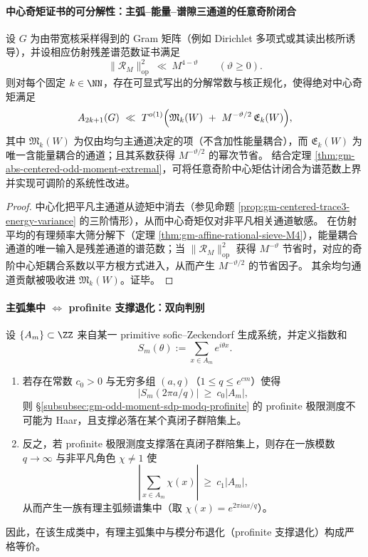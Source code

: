 \paragraph{中心奇矩证书的可分解性：主弧--能量--谱隙三通道的任意奇阶闭合}
\begin{proposition}\label{prop:gm-abs-centered-moment-three-channels}
设 \(G\) 为由带宽核采样得到的 Gram 矩阵（例如 Dirichlet 多项式或其读出核所诱导），并设相应仿射残差谱范数证书满足
\[
\|\mathcal{R}_M\|_{\mathrm{op}}^2\ \ll\ M^{4-\vartheta}\qquad(\vartheta\ge 0).
\]
则对每个固定 \(k\in\NN\)，存在可显式写出的分解常数与核正规化，使得绝对中心奇矩满足
\[
A_{2k+1}(G)\ \ll\ T^{o(1)}
\Bigl(
\mathfrak{M}_k(W)\ +\ M^{-\vartheta/2}\,\mathfrak{E}_k(W)
\Bigr),
\]
其中 \(\mathfrak{M}_k(W)\) 为仅由均匀主通道决定的项（不含加性能量耦合），而 \(\mathfrak{E}_k(W)\) 为唯一含能量耦合的通道；且其系数获得 \(M^{-\vartheta/2}\) 的幂次节省。
结合定理 \ref{thm:gm-abs-centered-odd-moment-extremal}，可将任意奇阶中心矩估计闭合为谱范数上界并实现可调阶的系统性改进。
\end{proposition}

\begin{proof}
中心化把平凡主通道从迹矩中消去（参见命题 \ref{prop:gm-centered-trace3-energy-variance} 的三阶情形），从而中心奇矩仅对非平凡相关通道敏感。
在仿射平均的有理频率大筛分解下（定理 \ref{thm:gm-affine-rational-sieve-M4}），能量耦合通道的唯一输入是残差通道的谱范数；当 \(\|\mathcal{R}_M\|_{\mathrm{op}}^2\) 获得 \(M^{-\vartheta}\) 节省时，对应的奇阶中心矩耦合系数以平方根方式进入，从而产生 \(M^{-\vartheta/2}\) 的节省因子。
其余均匀通道贡献被吸收进 \(\mathfrak{M}_k(W)\)。证毕。
\end{proof}

\paragraph{主弧集中 \texorpdfstring{$\Longleftrightarrow$}{<->} profinite 支撑退化：双向判别}
\begin{theorem}\label{thm:gm-major-arc-profinite-equivalence}
设 \(\{A_m\}\subset\ZZ\) 来自某一 primitive sofic--Zeckendorf 生成系统，并定义指数和
\[
S_m(\theta):=\sum_{x\in A_m}e^{i\theta x}.
\]
\begin{enumerate}
  \item 若存在常数 \(c_0>0\) 与无穷多组 \((a,q)\)（\(1\le q\le e^{cm}\)）使得
  \[
  |S_m(2\pi a/q)|\ \ge\ c_0|A_m|,
  \]
  则 \S\ref{subsubsec:gm-odd-moment-sdp-modq-profinite} 的 profinite 极限测度不可能为 Haar，且支撑必落在某个真闭子群陪集上。
  \item 反之，若 profinite 极限测度支撑落在真闭子群陪集上，则存在一族模数 \(q\to\infty\) 与非平凡角色 \(\chi\neq 1\) 使
  \[
  \left|\sum_{x\in A_m}\chi(x)\right|\ \ge\ c_1|A_m|,
  \]
  从而产生一族有理主弧频谱集中（取 \(\chi(x)=e^{2\pi i a x/q}\)）。
\end{enumerate}
因此，在该生成类中，有理主弧集中与模分布退化（profinite 支撑退化）构成严格等价。
\end{theorem}

